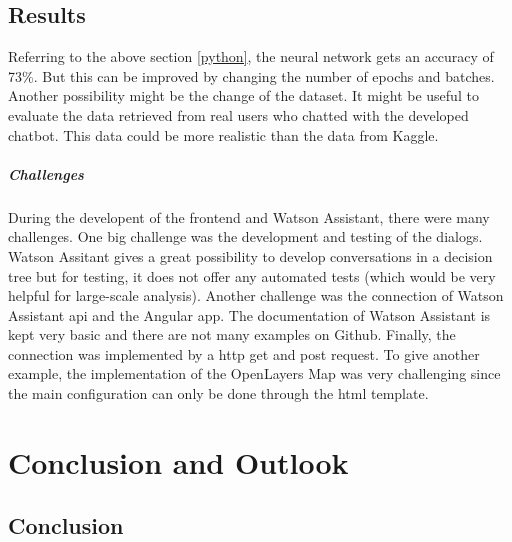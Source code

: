 \section{Results}
Referring to the above section \ref{python}, the neural network gets an accuracy of 73\%. But this can be improved by changing the number of epochs and batches. Another possibility might be the change of the dataset. It might be useful to evaluate the data retrieved from real users who chatted with the developed chatbot. This data could be more realistic than the data from Kaggle.

\paragraph{Challenges}
During the developent of the frontend and Watson Assistant, there were many challenges. One big challenge was the development and testing of the dialogs. Watson Assitant gives a great possibility to develop conversations in a decision tree but for testing, it does not offer any automated tests (which would be very helpful for large-scale analysis). 
Another challenge was the connection of Watson Assistant \ac{api} and the Angular app. The documentation of Watson Assistant is kept very basic and there are not many examples on Github. Finally, the connection was implemented by a \ac{http} get and post request. 
To give another example, the implementation of the OpenLayers Map was very challenging since the main configuration can only be done through the \ac{html} template. 

\chapter{Conclusion and Outlook}
\section{Conclusion}

